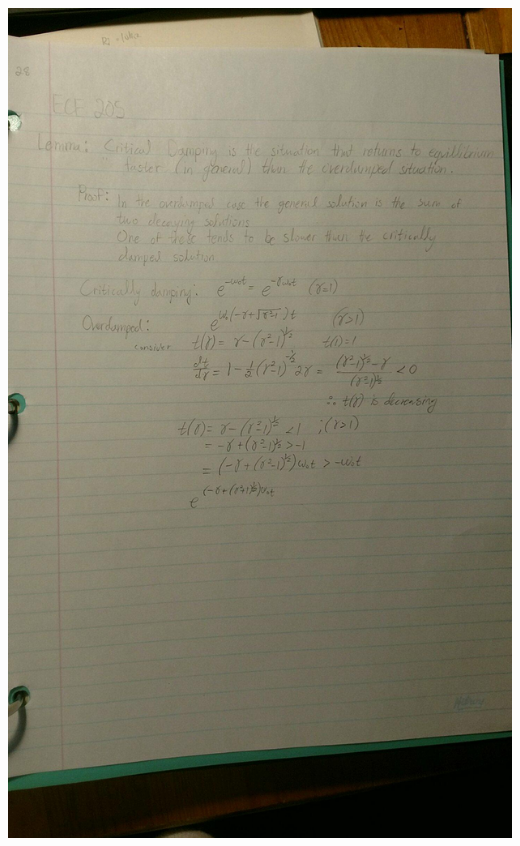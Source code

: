 \documentclass[11pt]{article}
\theoremstyle{definition}
\begin{document}
\includegraphics[width=\textwidth,height=\textheight,keepaspectratio]{friday/6.jpg}\\
\restoregeometry
\clearpage
\newpage
\end{document}
